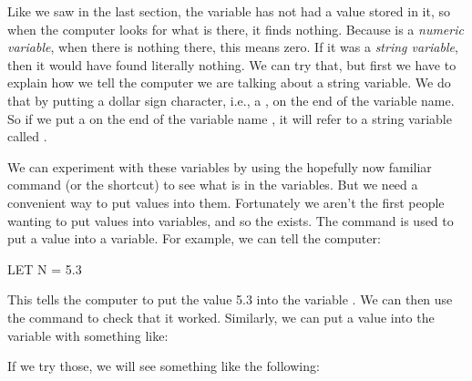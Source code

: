 
Like we saw in the last section, the variable  has not had a value stored in it, so when the computer looks for
what is there, it finds nothing.  Because  is a {\em numeric variable}, when there is
nothing there, this means zero.  If it was a {\em string variable}, then it would have found literally nothing.
We can try that, but first we have to explain how we tell the computer we are talking about a string variable.  We do that by
putting a dollar sign character, i.e., a \screentextwide{\$}, on the end of the variable name. So if we put a \screentextwide{\$} on
the end of the variable name , it will refer to a string variable called .

\needspace{4cm} %
We can experiment with these variables by using the hopefully now familiar
 command (or the  shortcut)
to see what is in the variables. But we need a convenient way to put
values into them.  Fortunately we aren't the first people wanting to
put values into variables, and so the
 exists.
The  command is used to put a value into a
variable.  For example, we can tell the computer:

\begin{screencode}
  LET N = 5.3
\end{screencode}

\needspace{4cm} %
This tells the computer to put the value 5.3 into the variable
.  We can then use the 
command to check that it worked.  Similarly, we can put a value into
the variable  with something like:


\needspace{4cm} %
If we try those, we will see something like the following:


